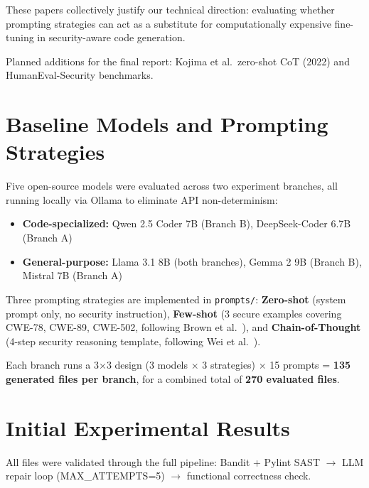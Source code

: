 \documentclass[11pt,a4paper]{article}
\begin{document}
These papers collectively justify our technical direction: evaluating whether prompting strategies can act as a substitute for computationally expensive fine-tuning in security-aware code generation.

Planned additions for the final report: Kojima et al.\ zero-shot CoT (2022) and HumanEval-Security benchmarks.

\section{Baseline Models and Prompting Strategies}

Five open-source models were evaluated across two experiment branches, all running locally via Ollama to eliminate API non-determinism:

\begin{itemize}[noitemsep]
    \item \textbf{Code-specialized:} Qwen 2.5 Coder 7B (Branch B), DeepSeek-Coder 6.7B (Branch A)
    \item \textbf{General-purpose:} Llama 3.1 8B (both branches), Gemma 2 9B (Branch B), Mistral 7B (Branch A)
\end{itemize}

Three prompting strategies are implemented in \texttt{prompts/}: \textbf{Zero-shot} (system prompt only, no security instruction), \textbf{Few-shot} (3 secure examples covering CWE-78, CWE-89, CWE-502, following Brown et al.~\cite{brown2020gpt3}), and \textbf{Chain-of-Thought} (4-step security reasoning template, following Wei et al.~\cite{wei2022cot}).

Each branch runs a 3×3 design (3 models × 3 strategies) × 15 prompts = \textbf{135 generated files per branch}, for a combined total of \textbf{270 evaluated files}.

\section{Initial Experimental Results}

All files were validated through the full pipeline: Bandit + Pylint SAST $\rightarrow$ LLM repair loop (MAX\_ATTEMPTS=5) $\rightarrow$ functional correctness check.
\end{document}
